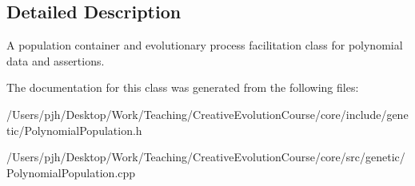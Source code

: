 \subsection{Detailed Description}
A population container and evolutionary process facilitation class for polynomial data and assertions. 

The documentation for this class was generated from the following files\-:\begin{DoxyCompactItemize}
\item 
/\-Users/pjh/\-Desktop/\-Work/\-Teaching/\-Creative\-Evolution\-Course/core/include/genetic/Polynomial\-Population.\-h\item 
/\-Users/pjh/\-Desktop/\-Work/\-Teaching/\-Creative\-Evolution\-Course/core/src/genetic/Polynomial\-Population.\-cpp\end{DoxyCompactItemize}
